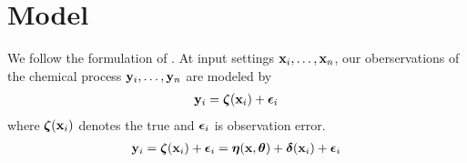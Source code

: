 \section{Model}

We follow the formulation of \cite{higdon:2008}. At input settings $\mathbf{\bm{x}}_i,\ldots,\mathbf{\bm{x}}_n$, our oberservations of the chemical process $\mathbf{\bm{y}}_i,\ldots,\mathbf{\bm{y}}_n$ are modeled by
\begin{eqnarray}
\mathbf{\bm{y}}_i = \mathbf{\bm{\zeta}}(\mathbf{\bm{x}}_i) + \mathbf{\bm{\epsilon}}_i
\end{eqnarray}
where $\mathbf{\bm{\zeta}}(\mathbf{\bm{x}}_i)$ denotes the true and $\mathbf{\bm{\epsilon}}_i$ is observation error. 
\begin{eqnarray}
\mathbf{\bm{y}}_i = \mathbf{\bm{\zeta}}(\mathbf{\bm{x}}_i)  + \mathbf{\bm{\epsilon}}_i = \mathbf{\bm{\eta}}(\mathbf{\bm{x}}, \mathbf{\bm{\theta}}) + \mathbf{\bm{\delta}}(\mathbf{\bm{x}}_i) + \mathbf{\bm{\epsilon}}_i
\end{eqnarray}
